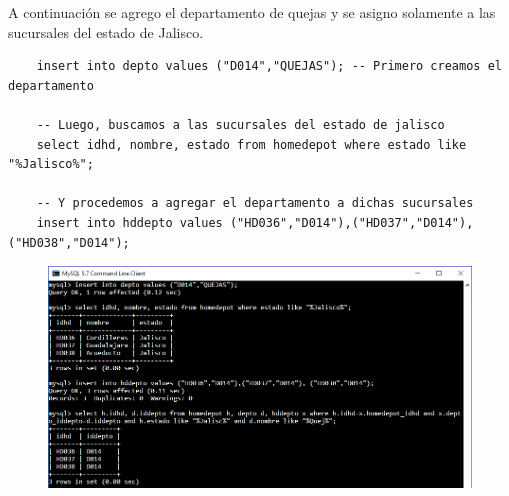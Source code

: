 \documentclass[12pt, titlepage]{article}
\begin{document}
	A continuación se agrego el departamento de quejas y se asigno solamente a las sucursales del estado de Jalisco.
	\begin{lstlisting}
	insert into depto values ("D014","QUEJAS"); -- Primero creamos el departamento
	
	-- Luego, buscamos a las sucursales del estado de jalisco
	select idhd, nombre, estado from homedepot where estado like "%Jalisco%";
	
	-- Y procedemos a agregar el departamento a dichas sucursales
	insert into hddepto values ("HD036","D014"),("HD037","D014"), ("HD038","D014");
	\end{lstlisting}
	\begin{figure}[H]
		\begin{center}
			\includegraphics[width=\textwidth]{img/cinco.png}
			\label{fig:cinco}
		\end{center}
	\end{figure}
	
\end{document}
